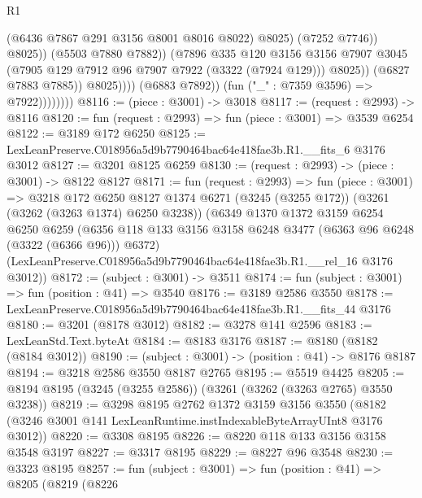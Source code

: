\begin{lexlean}{R1}
\begin{coremodule}
                                          (@6436 @7867 @291 @3156 @8001 @8016 @8022)
                                          @8025)
                                        (@7252 @7746))
                                      @8025))
                                  (@5503 @7880 @7882))
                                (@7896
                                  @335
                                  @120
                                  @3156
                                  @3156
                                  @7907
                                  @3045
                                  (@7905 @129 @7912 @96 @7907 @7922 (@3322 (@7924 @129)))
                                  @8025))
                              (@6827 @7883 @7885))
                            @8025))))
                    (@6883 @7892))
                  (fun ("_" : @7359 @3596) => @7922))))))))
@8116 := (piece : @3001) -> @3018
@8117 := (request : @2993) -> @8116
@8120 := fun (request : @2993) => fun (piece : @3001) => @3539 @6254
@8122 := @3189 @172 @6250
@8125 := LexLeanPreserve.C018956a5d9b7790464bac64e418fae3b.R1.__fits_6 @3176 @3012
@8127 := @3201 @8125 @6259
@8130 := (request : @2993) -> (piece : @3001) -> @8122 @8127
@8171 := fun (request : @2993) =>
  fun (piece : @3001) =>
  @3218
    @172
    @6250
    @8127
    @1374
    @6271
    (@3245 (@3255 @172))
    (@3261 (@3262 (@3263 @1374) @6250 @3238))
    (@6349
      @1370
      @1372
      @3159
      @6254
      @6250
      @6259
      (@6356 @118 @133 @3156 @3158 @6248 @3477 (@6363 @96 @6248 (@3322 (@6366 @96))) @6372)
      (LexLeanPreserve.C018956a5d9b7790464bac64e418fae3b.R1.__rel_16 @3176 @3012))
@8172 := (subject : @3001) -> @3511
@8174 := fun (subject : @3001) => fun (position : @41) => @3540
@8176 := @3189 @2586 @3550
@8178 := LexLeanPreserve.C018956a5d9b7790464bac64e418fae3b.R1.__fits_44 @3176
@8180 := @3201 (@8178 @3012)
@8182 := @3278 @141 @2596
@8183 := LexLeanStd.Text.byteAt
@8184 := @8183 @3176
@8187 := @8180 (@8182 (@8184 @3012))
@8190 := (subject : @3001) -> (position : @41) -> @8176 @8187
@8194 := @3218 @2586 @3550 @8187 @2765
@8195 := @5519 @4425
@8205 := @8194 @8195 (@3245 (@3255 @2586)) (@3261 (@3262 (@3263 @2765) @3550 @3238))
@8219 := @3298
    @8195
    @2762
    @1372
    @3159
    @3156
    @3550
    (@8182 (@3246 @3001 @141 LexLeanRuntime.instIndexableByteArrayUInt8 @3176 @3012))
@8220 := @3308 @8195
@8226 := @8220 @118 @133 @3156 @3158 @3548 @3197
@8227 := @3317 @8195
@8229 := @8227 @96 @3548
@8230 := @3323 @8195
@8257 := fun (subject : @3001) =>
  fun (position : @41) =>
  @8205
    (@8219
      (@8226

\end{coremodule}
\end{lexlean}
